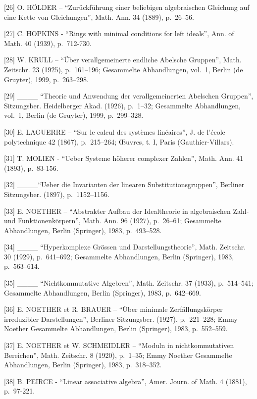 {[}26{]} O. HÖLDER -- ``Zurückführung einer beliebigen algebraischen Gleichung auf eine Kette von Gleichungen'', Math. Ann. 34 (1889), p.~26--56.

{[}27{]} C. HOPKINS - ``Rings with minimal conditions for left ideals'', Ann. of Math. 40 (1939), p.~712-730.

{[}28{]} W. KRULL -- ``Über verallgemeinerte endliche Abelsche Gruppen'', Math. Zeitschr. 23 (1925), p.~161--196; Gesammelte Abhandlungen, vol.~1, Berlin (de Gruyter), 1999, p.~263--298.

{[}29{]} \_\_\_\_ ``Theorie und Anwendung der verallgemeinerten Abelschen Gruppen'', Sitzungsber. Heidelberger Akad. (1926), p.~1--32; Gesammelte Abhandlungen, vol.~1, Berlin (de Gruyter), 1999, p.~299--328.

{[}30{]} E. LAGUERRE -- ``Sur le calcul des systèmes linéaires'', J. de l'école polytechnique 42 (1867), p.~215--264; Œuvres, t. I, Paris (Gauthier-Villars).

{[}31{]} T. MOLIEN - ``Ueber Systeme höherer complexer Zahlen'', Math. Ann. 41 (1893), p.~83-156.

{[}32{]} \_\_\_\_``Ueber die Invarianten der linearen Substitutionsgruppen'', Berliner Sitzungsber. (1897), p.~1152--1156.

{[}33{]} E. NOETHER -- ``Abstrakter Aufbau der Idealtheorie in algebraischen Zahl- und Funktionenkörpern'', Math. Ann. 96 (1927), p.~26--61; Gesammelte Abhandlungen, Berlin (Springer), 1983, p.~493--528.

{[}34{]} \_\_\_\_ ``Hyperkomplexe Grössen und Darstellungstheorie'', Math. Zeitschr. 30 (1929), p.~641--692; Gesammelte Abhandlungen, Berlin (Springer), 1983, p.~563--614.

{[}35{]} \_\_\_\_ ``Nichtkommutative Algebren'', Math. Zeitschr. 37 (1933), p.~514--541; Gesammelte Abhandlungen, Berlin (Springer), 1983, p.~642--669.

{[}36{]} E. NOETHER et R. BRAUER -- ``Über minimale Zerfällungskörper irreduzibler Darstellungen'', Berliner Sitzungsber. (1927), p.~221--228; Emmy Noether Gesammelte Abhandlungen, Berlin (Springer), 1983, p.~552--559.

{[}37{]} E. NOETHER et W. SCHMEIDLER -- ``Moduln in nichtkommutativen Bereichen'', Math. Zeitschr. 8 (1920), p.~1--35; Emmy Noether Gesammelte Abhandlungen, Berlin (Springer), 1983, p.~318--352.

{[}38{]} B. PEIRCE - ``Linear associative algebra'', Amer. Journ. of Math. 4 (1881), p.~97-221.

